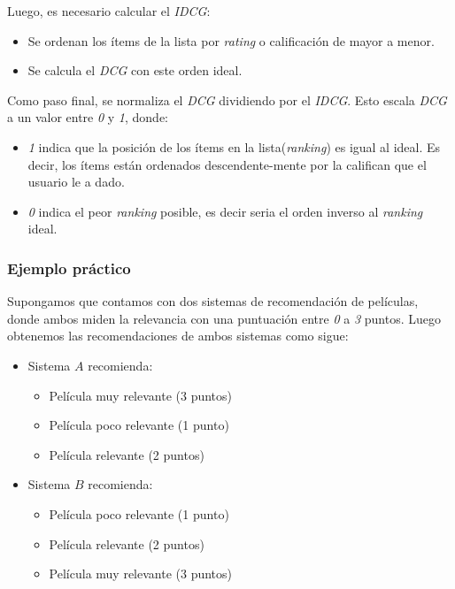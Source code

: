 \documentclass[11pt,a4paper,twoside]{thesis}
\begin{document}
Luego, es necesario calcular el \textit{IDCG}:
\begin{itemize}
	\item Se ordenan los ítems de la lista por \textit{rating} o calificación de mayor a menor.
	\item Se calcula el \textit{DCG} con este orden ideal.
\end{itemize}

Como paso final, se normaliza el \textit{DCG} dividiendo por el \textit{IDCG}. Esto escala \textit{DCG} a un valor entre \textit{0} y \textit{1}, donde:

\begin{itemize}
	\item \textit{1} indica que la posición de los ítems en la lista(\textit{ranking}) es igual al ideal. Es decir, los ítems están ordenados descendente-mente por la califican que el usuario le a dado.
	\item \textit{0} indica el peor \textit{ranking} posible, es decir seria el orden inverso al \textit{ranking} ideal.
\end{itemize}

\subsubsection{Ejemplo práctico}

Supongamos que contamos con dos sistemas de recomendación de películas, donde ambos miden la relevancia con una puntuación entre \textit{0} a \textit{3} puntos. Luego obtenemos las recomendaciones de ambos sistemas como sigue:

\begin{itemize}
	\item Sistema $A$ recomienda:
	      \begin{itemize}
		      \item Película muy relevante (3 puntos)
		      \item Película poco relevante (1 punto)
		      \item Película relevante (2 puntos)
	      \end{itemize}

	\item Sistema $B$ recomienda:
	      \begin{itemize}
		      \item Película poco relevante (1 punto)
		      \item Película relevante (2 puntos)
		      \item  Película muy relevante (3 puntos)
	      \end{itemize}
\end{itemize}
\end{document}
